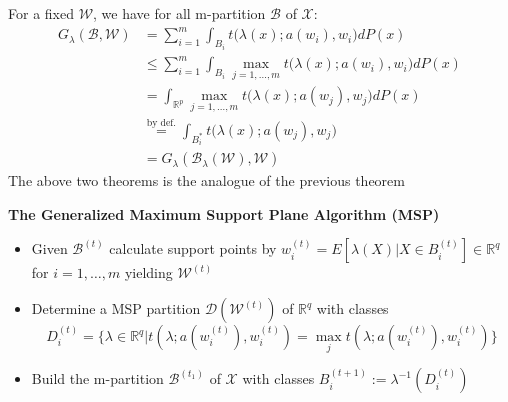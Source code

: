 \documentclass{article}
\begin{document}
\begin{tcolorbox}[coltitle= black!80, colframe=blue!35, colback=blue!10 ,title=\textbf{Proof of Theorem}]
For a fixed $\mathcal W$, we have for all m-partition $\mathcal B$ of $\mathcal X$:
\vspace{-2mm}
\begin{align}
	G_\lambda(\mathcal B, \mathcal W) &= \sum_{i=1}^m \int_{B_i} t\big( \lambda(x) ; a(w_i), w_i \big)dP(x)\\
	& \le \sum_{i=1}^m \int_{B_i} \max_{j = 1,\ldots,m} t\big( \lambda(x); a(w_i), w_i \big)dP(x)\\
	& = \int_{\mathbb R^p} \max_{j = 1,\ldots,m} t\big( \lambda(x); a(w_j), w_j \big)dP(x)\\
	& \overset{\text{by def.}}{=} \int_{B_i^*} t\big( \lambda(x); a(w_j), w_j \big) \\
	& = G_\lambda(\mathcal B_\lambda(\mathcal W), \mathcal W)
\end{align}
The above two theorems is the analogue of the previous theorem

\end{tcolorbox}




\textbf{The Generalized Maximum Support Plane Algorithm (MSP)}
\begin{itemize}
	\item Given $\mathcal B^{(t)}$ calculate support points by $w_i^{(t)} = E[\lambda (X) | X\in B_i^{(t)}]\in \mathbb R^q$ for $i = 1,\ldots,m$ yielding $\mathcal W^{(t)}$
	\item Determine a MSP partition $\mathcal D(\mathcal W^{(t)})$ of $\mathbb R^q$ with classes \\ \begin{equation*}
		D_i^{(t)} = \{ \lambda \in \mathbb R^q | t(\lambda; a(w_i^{(t)}), w_i^{(t)}) = \max_j t(\lambda; a(w_i^{(t)}), w_i^{(t)}) \}
	\end{equation*}
	\item Build the m-partition $\mathcal B^{(t_1)}$ of $\mathcal X$ with classes $B_i^{(t+1)}:=\lambda^{-1}(D_i^{(t)})$

\end{itemize}
\end{document}
